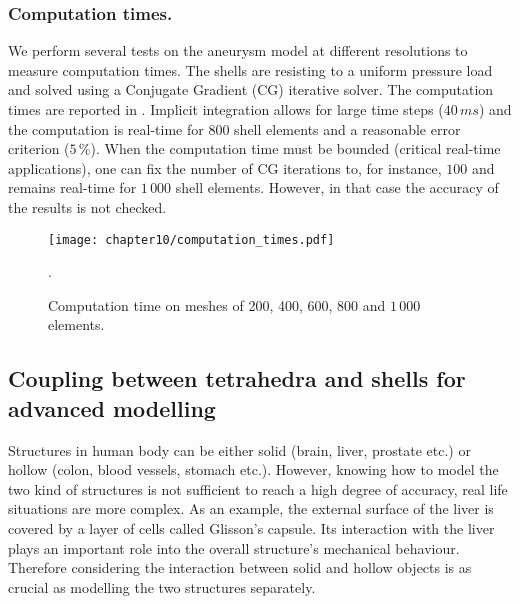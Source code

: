 \subsubsection*{Computation times.}
We perform several tests on the aneurysm model at different resolutions to measure computation times. The shells are resisting to a uniform pressure load and solved using a Conjugate Gradient (CG) iterative solver. The computation times are reported in . Implicit integration allows for large time steps ($40\,ms$) and the computation is real-time for 800 shell elements and a reasonable error criterion ($5\,\%$). When the computation time must be bounded (critical real-time applications), one can fix the number of CG iterations to, for instance, $100$ and remains real-time for $1\,000$ shell elements. However, in that case the accuracy of the results is not checked.
%
\begin{figure}[ht]
\centering
\texttt{[image: chapter10/computation\_times.pdf]}
\caption {Computation time on meshes of 200, 400, 600, 800 and $ 1\,000 $ elements.}.
\label{chap10:fig-computation}
\end{figure}

\subsection{Coupling between tetrahedra and shells for advanced modelling}
Structures in human body can be either solid (brain, liver, prostate etc.) or hollow (colon, blood vessels, stomach etc.). However, knowing how to model the two kind of structures is not sufficient to reach a high degree of accuracy, real life situations are more complex. As an example, the external surface of the liver is covered by a layer of cells called Glisson's capsule. Its interaction with the liver plays an important role into the overall structure's mechanical behaviour. Therefore considering the interaction between solid and hollow objects is as crucial as modelling the two structures separately. 

